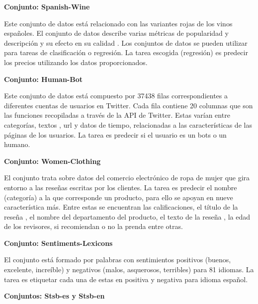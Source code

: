 \begin{annexes}
\begin{flushleft} 
    { \textbf{Conjunto: Spanish-Wine}}\label{description:wine}
\end{flushleft}

Este conjunto de datos está relacionado con las variantes rojas de los vinos españoles. El conjunto de datos describe varias métricas de popularidad y descripción y su efecto en su calidad . Los conjuntos de datos se pueden utilizar para tareas de clasificación o regresión. La tarea escogida (regresión) es predecir los precios utilizando los datos proporcionados.

\begin{flushleft} 
    { \textbf{Conjunto: Human-Bot}}\label{description:human}
\end{flushleft}

Este conjunto de datos está compuesto por 37438 filas correspondientes a diferentes cuentas de usuarios en Twitter. Cada fila contiene 20 columnas que son las funciones recopiladas a través de la API de Twitter. Estas varían entre categorías, textos , url y datos de tiempo, relacionadas a las características de las páginas de los usuarios. La tarea es predecir si el usuario es un bots o un humano. 


\begin{flushleft} 
    { \textbf{Conjunto: Women-Clothing}}\label{description:women}
\end{flushleft}

El conjunto trata sobre datos del comercio electrónico de ropa de mujer que gira entorno a las reseñas escritas por los clientes.  La tarea es predecir el nombre (categoría) a la que corresponde un producto, para ello se apoyan en nueve característica más. Entre estas se encuentran las calificaciones, el título de la reseña , el nombre del departamento del producto, el texto de la reseña , la edad de los revisores, si recomiendan o no la prenda entre otras. 

\begin{flushleft} 
    { \textbf{Conjunto: Sentiments-Lexicons}}\label{description:sentiments}
\end{flushleft}

El conjunto está formado por palabras con sentimientos positivos (buenos, excelente, increíble) y negativos (malos, asquerosos, terribles) para 81 idiomas. La tarea es etiquetar cada una de estas en positiva y negativa para idioma español. 

\begin{flushleft} 
    { \textbf{Conjuntos: Stsb-es y Stsb-en}}\label{description:stsb}
\end{flushleft}


\end{annexes}
